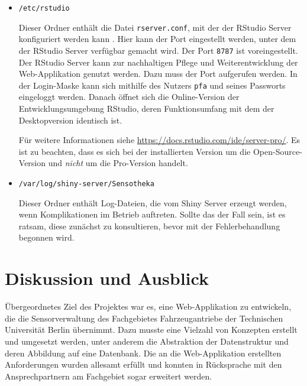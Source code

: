 \documentclass[
]{article}
\begin{document}
\begin{itemize}
\item
  \texttt{/etc/rstudio}

  Dieser Ordner enthält die Datei \texttt{rserver.conf}, mit der der RStudio Server konfiguriert werden kann \autocite{rstudio-server}. Hier kann der Port eingestellt werden, unter dem der RStudio Server verfügbar gemacht wird. Der Port \texttt{8787} ist voreingestellt. Der RStudio Server kann zur nachhaltigen Pflege und Weiterentwicklung der Web-Applikation genutzt werden. Dazu muss der Port aufgerufen werden. In der Login-Maske kann sich mithilfe des Nutzers \texttt{pfa} und seines Passworts eingeloggt werden. Danach öffnet sich die Online-Version der Entwicklungsumgebung RStudio, deren Funktionsumfang mit dem der Desktopversion identisch ist.

  Für weitere Informationen siehe \url{https://docs.rstudio.com/ide/server-pro/}. Es ist zu beachten, dass es sich bei der installierten Version um die Open-Source-Version und \emph{nicht} um die Pro-Version handelt.
\end{itemize}

\begin{itemize}
\item
  \texttt{/var/log/shiny-server/Sensotheka}

  Dieser Ordner enthält Log-Dateien, die vom Shiny Server erzeugt werden, wenn Komplikationen im Betrieb auftreten. Sollte das der Fall sein, ist es ratsam, diese zunächst zu konsultieren, bevor mit der Fehlerbehandlung begonnen wird.
\end{itemize}

\hypertarget{discussion}{%
\section{Diskussion und Ausblick}\label{discussion}}

Übergeordnetes Ziel des Projektes war es, eine Web-Applikation zu entwickeln, die die Sensorverwaltung des Fachgebietes Fahrzeugantriebe der Technischen Universität Berlin übernimmt. Dazu musste eine Vielzahl von Konzepten erstellt und umgesetzt werden, unter anderem die Abstraktion der Datenstruktur und deren Abbildung auf eine Datenbank. Die an die Web-Applikation erstellten Anforderungen wurden allesamt erfüllt und konnten in Rücksprache mit den Ansprechpartnern am Fachgebiet sogar erweitert werden.
\end{document}

